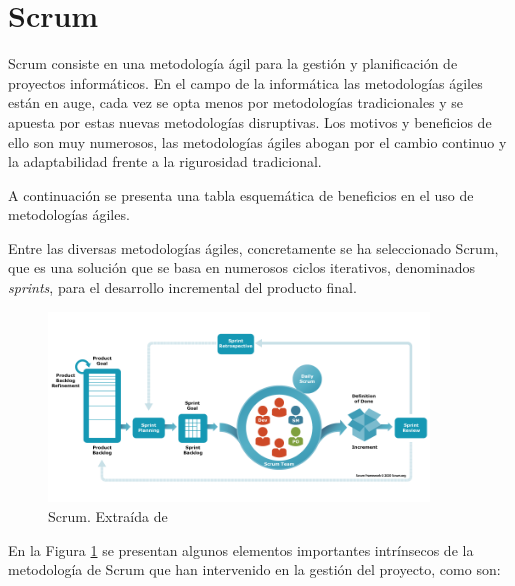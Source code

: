 \section{Scrum} \label{sec:04crum} %

Scrum \cite{scrumWebsite} consiste en una metodología ágil para la gestión y planificación de proyectos informáticos. En el campo de la informática las metodologías ágiles están en auge, cada vez se opta menos por metodologías tradicionales y se apuesta por estas nuevas metodologías disruptivas. Los motivos y beneficios de ello son muy numerosos, las metodologías ágiles abogan por el cambio continuo y la adaptabilidad frente a la rigurosidad tradicional. 

A continuación se presenta una tabla esquemática de beneficios en el uso de metodologías ágiles.



Entre las diversas metodologías ágiles, concretamente se ha seleccionado Scrum, que es una solución que se basa en numerosos ciclos iterativos, denominados \textit{sprints}, para el desarrollo incremental del producto final.

\begin{figure}[H]
    \centering
    \includegraphics[width=0.90\textwidth]{figures/scrumFramework.png}
     \caption{Scrum. Extraída de \cite{scrumWebsite}}
    \label{fig:scrumFramework}
\end{figure}

En la Figura \ref{fig:scrumFramework} se presentan algunos elementos importantes intrínsecos de la metodología de Scrum que han intervenido en la gestión del proyecto, como son:

